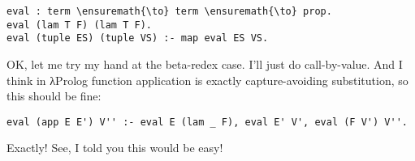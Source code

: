 \begin{verbatim}
eval : term \ensuremath{\to} term \ensuremath{\to} prop.
eval (lam T F) (lam T F).
eval (tuple ES) (tuple VS) :- map eval ES VS.
\end{verbatim}

\heroSTUDENT{} OK, let me try my hand at the beta-redex case. I'll just do
call-by-value. And I think in \foreignlanguage{greek}{λ}Prolog function application is exactly
capture-avoiding substitution, so this should be fine:

\begin{verbatim}
eval (app E E') V'' :- eval E (lam _ F), eval E' V', eval (F V') V''.
\end{verbatim}

\heroADVISOR{} Exactly! See, I told you this would be easy!
